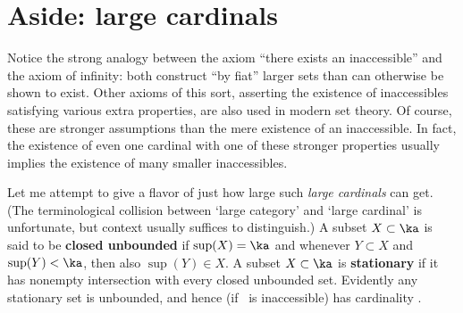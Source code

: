\documentclass[12pt]{amsart}
\begin{document}
\section{Aside: large cardinals}
\label{sec:large-cardinals}

Notice the strong analogy between the axiom ``there exists an
inaccessible'' and the axiom of infinity: both construct ``by fiat''
larger sets than can otherwise be shown to exist.  Other axioms of
this sort, asserting the existence of inaccessibles satisfying various
extra properties, are also used in modern set theory.  Of course,
these are stronger assumptions than the mere existence of an
inaccessible.  In fact, the existence of even one cardinal with one of
these stronger properties usually implies the existence of many
smaller inaccessibles.

Let me attempt to give a flavor of just how large such \emph{large
  cardinals} can get.  (The terminological collision between `large
category' and `large cardinal' is unfortunate, but context usually
suffices to distinguish.)  A subset $X\subset\ka$ is said to be
\textbf{closed unbounded} if $\sup(X) = \ka$ and whenever $Y\subset X$
and $\sup(Y) <\ka$, then also $\sup(Y) \in X$.  A subset $X\subset
\ka$ is \textbf{stationary} if it has nonempty intersection with every
closed unbounded set.  Evidently any stationary set is unbounded, and
hence (if \ka\ is inaccessible) has cardinality \ka.
\end{document}
